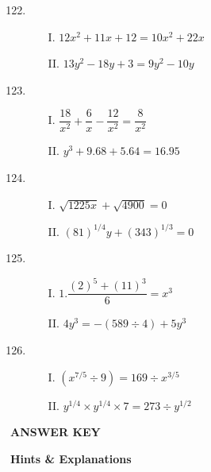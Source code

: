 \begin{multicols}{2}
\begin{enumerate}[leftmargin=*]
\setcounter{enumi}{121}
\item
\begin{itemize}
\item[I.] $12x^2 + 11x + 12 = 10x^2 + 22x$
\item[II.] $13y^2 - 18y + 3 = 9y^2 - 10y$
\end{itemize}

\item
\begin{itemize}
\item[I.] $\dfrac{18}{x^2} + \dfrac{6}{x} - \dfrac{12}{x^2} = \dfrac{8}{x^2}$
\item[II.] $y^3 + 9.68 + 5.64 = 16.95$
\end{itemize}

\item
\begin{itemize}
\item[I.] $\sqrt{1225x} + \sqrt{4900} = 0$
\item[II.] $(81)^{1/4}y + (343)^{1/3} = 0$
\end{itemize}

\item
\begin{itemize}
\item[I.] $1. \dfrac{(2)^{5} + (11)^{3}}{6} = x^3$
\item[II.] $4y^3 = -(589 \div 4) + 5y^3$
\end{itemize}

\item
\begin{itemize}
\item[I.] $(x^{7/5} \div 9) = 169 \div x^{3/5}$
\item[II.] $y^{1/4} \times y^{1/4} \times 7 = 273 \div y^{1/2}$
\end{itemize}
\end{enumerate}


\begin{center}
{\bf ANSWER KEY}
\end{center}

\bigskip

\begin{center}
{\bf Hints \& Explanations}
\end{center}


\end{multicols}
